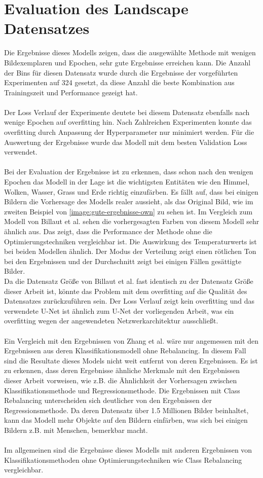 \section{Evaluation des Landscape Datensatzes}
Die Ergebnisse dieses Modells zeigen, dass die ausgewählte Methode mit wenigen Bildexemplaren und Epochen, sehr gute Ergebnisse erreichen kann.
Die Anzahl der Bins für diesen Datensatz wurde durch die Ergebnisse der vorgeführten Experimenten auf 324 gesetzt, da diese Anzahl die beste Kombination
aus Trainingszeit und Performance gezeigt hat.
\\
\\
Der Loss Verlauf der Experimente deutete bei diesem Datensatz ebenfalls nach wenige Epochen auf \gls{overfitting} hin. Nach Zahlreichen Experimenten
konnte das \gls{overfitting} durch Anpassung der Hyperparameter nur minimiert werden. Für die Auswertung der Ergebnisse wurde das Modell mit dem besten
Validation Loss verwendet.
\\
\\
Bei der Evaluation der Ergebnisse ist zu erkennen, dass schon nach den wenigen Epochen das Modell in der Lage ist die wichtigsten Entitäten wie den Himmel, Wolken, Wasser,
Grass und Erde richtig einzufärben. Es fällt auf, dass bei einigen Bildern die Vorhersage des Modells realer aussieht, als das Original Bild,
wie im zweiten Beispiel von \ref{image:gute-ergebnisse-own} zu sehen ist. Im Vergleich zum Modell von Billaut et al. sehen die vorhergesagten 
Farben von diesem Modell sehr ähnlich aus. Das zeigt, dass die Performance der Methode ohne die Optimierungstechniken vergleichbar ist.
Die Auswirkung des Temperaturwerts ist bei beiden Modellen ähnlich. Der Modus der Verteilung zeigt einen rötlichen Ton bei den
Ergebnissen und der Durchschnitt zeigt bei einigen Fällen gesättigte Bilder.
\\
Da die Datensatz Größe von Billaut et al. fast identisch zu der Datensatz Größe dieser Arbeit ist, könnte das Problem mit dem \gls{overfitting}
auf die Qualität des Datensatzes zurückzuführen sein. Der Loss Verlauf zeigt kein \gls{overfitting} und das verwendete U-Net ist ähnlich zum
U-Net der vorliegenden Arbeit, was ein \gls{overfitting} wegen der angewendeten Netzwerkarchitektur ausschließt. 
\\
\\
Ein Vergleich mit den Ergebnissen von Zhang et al. wäre nur angemessen mit den Ergebnissen aus deren Klassifikationsmodell ohne Rebalancing.
In diesem Fall sind die Resultate dieses Models nicht weit entfernt von deren Ergebnissen. Es ist zu erkennen, dass deren Ergebnisse ähnliche
Merkmale mit den Ergebnissen dieser Arbeit vorweisen, wie z.B. die Ähnlichkeit der Vorhersagen zwischen Klassifikationsmethode und Regressionsmethode.
Die Ergebnissen mit Class Rebalancing unterscheiden sich deutlicher von den Ergebnissen der Regressionsmethode. 
Da deren Datensatz über 1.5 Millionen Bilder beinhaltet, kann das Modell mehr Objekte auf den
Bildern einfärben, was sich bei einigen Bildern z.B. mit Menschen, bemerkbar macht. 
\\
\\
Im allgemeinen sind die Ergebnisse dieses Modells mit anderen Ergebnissen von Klassifikationsmethoden ohne Optimierungstechniken wie Class Rebalancing
vergleichbar.